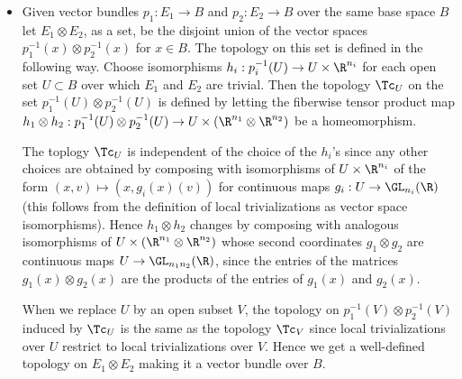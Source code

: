 \begin{defn}
\begin{itemize}
		\item Given vector bundles $p_1:E_1\to B$ and $p_2:E_2\to B$ over the same base space $B$ let $E_1\otimes E_2$, as a set, be the disjoint union of the vector spaces $p_1^{-1}(x)\otimes p_2^{-1}(x)$ for $x\in B$. The topology on this set is defined in the following way. Choose isomorphisms $h_i:p_i^{-1}(U)\to U\times\R^{n_i}$ for each open set $U\subset B$ over which $E_1$ and $E_2$ are trivial. Then the topology $\Tc_U$ on the set $p_1^{-1}(U)\otimes p_2^{-1}(U)$ is defined by letting the fiberwise tensor product map $h_1\otimes h_2:p_1^{-1}(U)\otimes p_2^{-1}(U)\to U\times (\R^{n_1}\otimes\R^{n_2})$ be a homeomorphism.
		
		The toplogy $\Tc_U$ is independent of the choice of the $h_i$'s since any other choices are obtained by composing with isomorphisms of $U\times\R^{n_i}$ of the form $(x,v)\mapsto(x,g_i(x)(v))$ for continuous maps $g_i:U\to \GL_{n_i}(\R)$ {\color{cyan}(this follows from the definition of local trivializations as vector space isomorphisms)}. Hence $h_1\otimes h_2$ changes by composing with analogous isomorphisms of $U\times (\R^{n_1}\otimes\R^{n_2})$ whose second coordinates $g_1\otimes g_2$ are continuous maps $U\to\GL_{n_1n_2}(\R)$, since the entries of the matrices $g_1(x)\otimes g_2(x)$ are the products of the entries of $g_1(x)$ and $g_2(x)$.
		
		When we replace $U$ by an open subset $V$, the topology on $p_1^{-1}(V)\otimes p_2^{-1}(V)$ induced by $\Tc_U$ is the same as the topology $\Tc_V$ since local trivializations over $U$ restrict to local trivializations over $V$. Hence we get a well-defined topology on $E_1\otimes E_2$ making it a vector bundle over $B$.
	\end{itemize}
\end{defn}
